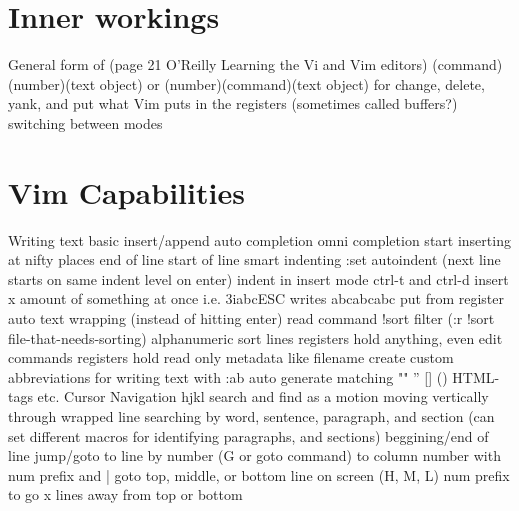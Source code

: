 \documentclass[12pt]{book}
\begin{document}
\section{Inner workings}
General form of (page 21 O'Reilly Learning the Vi and Vim editors) (command)(number)(text object) or (number)(command)(text object) for change, delete, yank, and put
what Vim puts in the registers (sometimes called buffers?)
switching between modes

\section{Vim Capabilities}
Writing text
  basic insert/append
  auto completion
  omni completion
  start inserting at nifty places 
    end of line
    start of line
    smart indenting
      :set autoindent (next line starts on same indent level on enter)
      indent in insert mode ctrl-t and ctrl-d
  insert x amount of something at once i.e. 3iabcESC writes abcabcabc
  put from register
  auto text wrapping (instead of hitting enter)
  read command
    !sort filter (:r !sort file-that-needs-sorting)
  alphanumeric sort lines
  registers hold anything, even edit commands 
  registers hold read only metadata like filename
  create custom abbreviations for writing text with :ab
  auto generate matching "" '' [] {} () HTML-tags etc.
Cursor Navigation 
  hjkl
  search and find as a motion
  moving vertically through wrapped line
  searching
  by word, sentence, paragraph, and section (can set different macros for identifying paragraphs, and sections)
  beggining/end of line
  jump/goto 
    to line by number (G or goto command)
    to column number with num prefix and |
    goto top, middle, or bottom line on screen (H, M, L) num prefix to go x lines away from top or bottom
\end{document}
